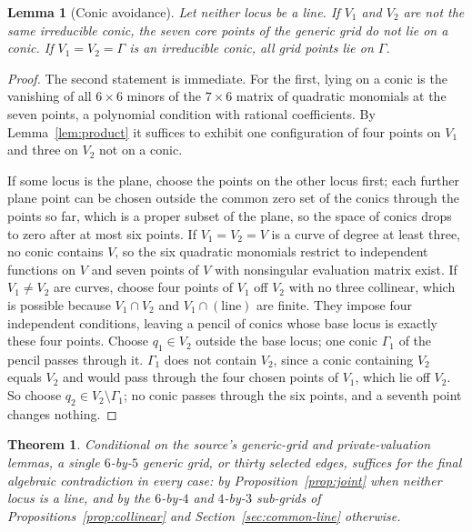 \documentclass[11pt]{article}
\newtheorem{theorem}{Theorem}
\newtheorem{lemma}{Lemma}
\theoremstyle{remark}
\begin{document}
\begin{lemma}[Conic avoidance]
\label{lem:conic}
Let neither locus be a line. If $V_1$ and $V_2$ are not the same
irreducible conic, the seven core points of the generic grid do not
lie on a conic. If $V_1=V_2=\Gamma$ is an irreducible conic, all
grid points lie on $\Gamma$.
\end{lemma}
\begin{proof}
The second statement is immediate. For the first, lying on a conic is
the vanishing of all $6\times6$ minors of the $7\times6$ matrix of
quadratic monomials at the seven points, a polynomial condition with
rational coefficients. By Lemma~\ref{lem:product} it suffices to
exhibit one configuration of four points on $V_1$ and three on $V_2$
not on a conic.

If some locus is the plane, choose the points on the other locus
first; each further plane point can be chosen outside the common zero
set of the conics through the points so far, which is a proper
subset of the plane, so the space of conics drops to zero after at
most six points. If $V_1=V_2=V$ is a curve of degree at least three,
no conic contains $V$, so the six quadratic monomials restrict to
independent functions on $V$ and seven points of $V$ with
nonsingular evaluation matrix exist. If $V_1\ne V_2$ are curves,
choose four points of $V_1$ off $V_2$ with no three collinear, which
is possible because $V_1\cap V_2$ and $V_1\cap(\text{line})$ are
finite. They impose four independent conditions, leaving a pencil of
conics whose base locus is exactly these four points. Choose
$q_1\in V_2$ outside the base locus; one conic $\Gamma_1$ of the
pencil passes through it. $\Gamma_1$ does not contain $V_2$, since a
conic containing $V_2$ equals $V_2$ and would pass through the four
chosen points of $V_1$, which lie off $V_2$. So choose
$q_2\in V_2\setminus\Gamma_1$; no conic passes through the six points,
and a seventh point changes nothing.
\end{proof}

\begin{theorem}
\label{thm:thirty}
Conditional on the source's generic-grid and private-valuation
lemmas, a single $6$-by-$5$ generic grid, or thirty selected edges,
suffices for the final algebraic contradiction in every case: by
Proposition~\ref{prop:joint} when neither locus is a line, and by the
$6$-by-$4$ and $4$-by-$3$ sub-grids of
Propositions~\ref{prop:collinear} and Section~\ref{sec:common-line}
otherwise.
\end{theorem}
\end{document}
